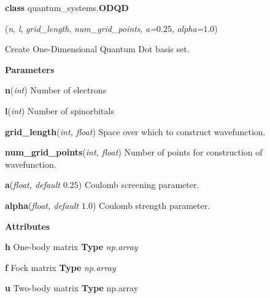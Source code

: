 \begin{tcolorbox}
    {\selectfont
    \textbf{class} quantum\_systems.\textbf{ODQD}

    \hspace{1em}(\emph{n}, \emph{l}, \emph{grid\_length}, \emph{num\_grid\_points}, 
    \emph{a=$0.25$}, \emph{alpha=$1.0$})

    \vspace{1em}
    Create One-Dimensional Quantum Dot basis set.
    \vspace{1em}

    \textbf{Parameters}

    \hspace{2em}\textbf{n}(\emph{int}) Number of electrons
    
    \hspace{2em}\textbf{l}(\emph{int}) Number of spinorbitals
    
    \hspace{2em}\textbf{grid\_length}(\emph{int, float}) Space over which to 
        construct wavefunction.
    
    \hspace{2em}\textbf{num\_grid\_points}(\emph{int, float}) Number of 
        points for construction of wavefunction.

    \hspace{2em}\textbf{a}(\emph{float, default $0.25$}) Coulomb screening parameter.
    
    \hspace{2em}\textbf{alpha}(\emph{float, default $1.0$}) Coulomb strength parameter. 

    \vspace{1em}
    \textbf{Attributes}

    \hspace{2em} \textbf{h}
    One-body matrix 
    \textbf{Type} \emph{np.array}
    
    \hspace{2em} \textbf{f}
    Fock matrix
    \textbf{Type} \emph{np.array}

    \hspace{2em} \textbf{u}
    Two-body matrix
    \textbf{Type} np.array



}
\end{tcolorbox}
